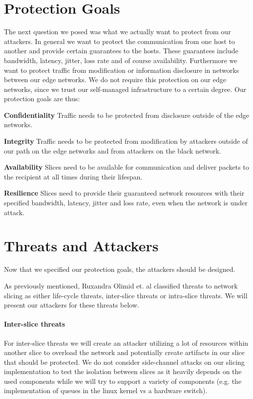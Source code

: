 \section{Protection Goals}
\label{protection_goals}
The next question we posed was what we actually want to protect from our attackers. In general we want to protect the communication from one host to another and provide certain guarantees to the hosts. These guarantees include bandwidth, latency, jitter, loss rate and of course availability. Furthermore we want to protect traffic from modification or information disclosure in networks between our edge networks. We do not require this protection on our edge networks, since we trust our self-managed infrastructure to a certain degree. Our protection goals are thus:
\begin{description}[style=multiline, labelwidth=0.7cm]
    \item[\namedlabel{P1}{P1}] \textbf{Confidentiality} Traffic needs to be protected from disclosure outside of the edge networks.
    \item[\namedlabel{P2}{P2}] \textbf{Integrity} Traffic needs to be protected from modification by attackers outside of our path on the edge networks and from attackers on the black network.
    \item[\namedlabel{P3}{P3}] \textbf{Availability} Slices need to be available for communication and deliver packets to the recipient at all times during their lifespan.
    \item[\namedlabel{P4}{P4}] \textbf{Resilience} Slices need to provide their guaranteed network resources with their specified bandwidth, latency, jitter and loss rate, even when the network is under attack.
\end{description}

\section{Threats and Attackers}
\label{adversaries}
Now that we specified our protection goals, the attackers should be designed.

As previously mentioned, Ruxandra Olimid et. al \cite{SE2} classified threats to network slicing as either life-cycle threats, inter-slice threats or intra-slice threats. We will present our attackers for these threats below.

\paragraph{Inter-slice threats} For inter-slice threats we will create an attacker utilizing a lot of resources within another slice to overload the network and potentially create artifacts in our slice that should be protected. We do not consider side-channel attacks on our slicing implementation to test the isolation between slices as it heavily depends on the used components while we will try to support a variety of components (e.g. the implementation of queues in the linux kernel vs a hardware switch).

